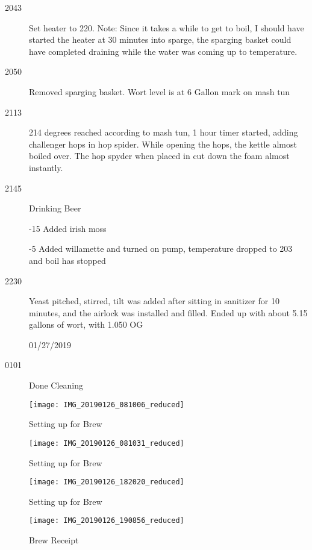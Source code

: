 \begin{description}
    \item[2043] Set heater to 220.  Note: Since it takes a while to get to boil, I should have started the heater at 30 minutes into sparge, the sparging basket could have completed draining while the water was coming up to temperature.
    \item[2050] Removed sparging basket.  Wort level is at 6 Gallon mark on mash tun
    \item[2113] 214 degrees reached according to mash tun, 1 hour timer started, adding challenger hops in hop spider.  While opening the hops, the kettle almost boiled over.  The hop spyder when placed in cut down the foam almost instantly.
    \item[2145] Drinking Beer

-15 Added irish moss

-5 Added willamette and turned on pump, temperature dropped to 203 and boil has stopped

\item[2230] Yeast pitched, stirred, tilt was added after sitting in sanitizer for 10 minutes, and the airlock was installed and filled.  Ended up with about 5.15 gallons of wort, with 1.050 OG

01/27/2019
\item[0101] Done Cleaning
\end{description}

\begin{figure}[H]
  \centering
  \texttt{[image: IMG\_20190126\_081006\_reduced]}
  \caption{Setting up for Brew}\label{fig:brew:setup}
\end{figure}

\begin{figure}[H]
  \centering
  \texttt{[image: IMG\_20190126\_081031\_reduced]}
  \caption{Setting up for Brew}\label{fig:brew:setup2}
\end{figure}

\begin{figure}[H]
  \centering
  \texttt{[image: IMG\_20190126\_182020\_reduced]}
  \caption{Setting up for Brew}\label{fig:brew:setup3}
\end{figure}

\begin{figure}[H]
  \centering
  \texttt{[image: IMG\_20190126\_190856\_reduced]}
  \caption{Brew Receipt}\label{fig:brew:receipt}
\end{figure}

